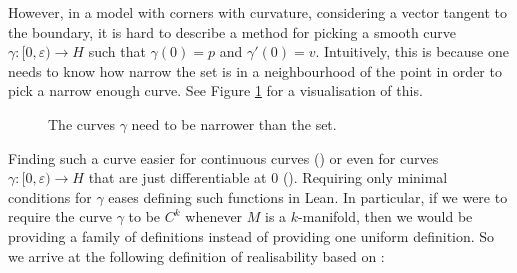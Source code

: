 However, in a model with corners with curvature, considering a vector tangent to the boundary, it is hard to describe a method for picking a smooth curve $\gamma \colon [0, \varepsilon) \to H$ such that $\gamma (0) = p$ and $\gamma' (0) = v$. 
Intuitively, this is because one needs to know how narrow the set is in a neighbourhood of the point in order to pick a narrow enough curve. 
See Figure \ref{fig:narrowCurves} for a visualisation of this.

\begin{figure}
\centering
\begin{minipage}[b]{0.4\linewidth}
\end{minipage}
\hspace{1cm}
\begin{minipage}[b]{0.4\linewidth}
\end{minipage}
\caption{The curves $\gamma$ need to be narrower than the set.}
\label{fig:narrowCurves}
\end{figure}

Finding such a curve easier for continuous curves (\cite{Rios2018}) or even for curves $\gamma \colon [0, \varepsilon) \to H$ that are just differentiable at $0$ (\cite{Rockafellar1998}). 
Requiring only minimal conditions for $\gamma$ eases defining such functions in Lean. 
In particular, if we were to require the curve $\gamma$ to be $C^k$ whenever $M$ is a $k$-manifold, then we would be providing a family of definitions instead of providing one uniform definition. 
So we arrive at the following definition of realisability based on \cite{Rockafellar1998}:

